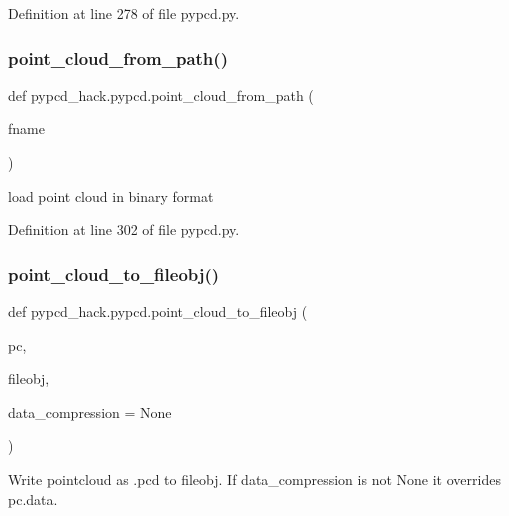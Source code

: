 Definition at line 278 of file pypcd.\+py.

\mbox{\label{namespacepypcd__hack_1_1pypcd_af5959f034a9db1fd00fef3701280d699}} 
\subsubsection{\texorpdfstring{point\+\_\+cloud\+\_\+from\+\_\+path()}{point\_cloud\_from\_path()}}
{\footnotesize\ttfamily def pypcd\+\_\+hack.\+pypcd.\+point\+\_\+cloud\+\_\+from\+\_\+path (\begin{DoxyParamCaption}\item[{}]{fname }\end{DoxyParamCaption})}

\begin{DoxyVerb}load point cloud in binary format
\end{DoxyVerb}
 

Definition at line 302 of file pypcd.\+py.

\mbox{\label{namespacepypcd__hack_1_1pypcd_a795df6c9f99ef82898730a9894b59283}} 
\subsubsection{\texorpdfstring{point\+\_\+cloud\+\_\+to\+\_\+fileobj()}{point\_cloud\_to\_fileobj()}}
{\footnotesize\ttfamily def pypcd\+\_\+hack.\+pypcd.\+point\+\_\+cloud\+\_\+to\+\_\+fileobj (\begin{DoxyParamCaption}\item[{}]{pc,  }\item[{}]{fileobj,  }\item[{}]{data\+\_\+compression = {\ttfamily None} }\end{DoxyParamCaption})}

\begin{DoxyVerb}Write pointcloud as .pcd to fileobj.
If data_compression is not None it overrides pc.data.
\end{DoxyVerb}
 

